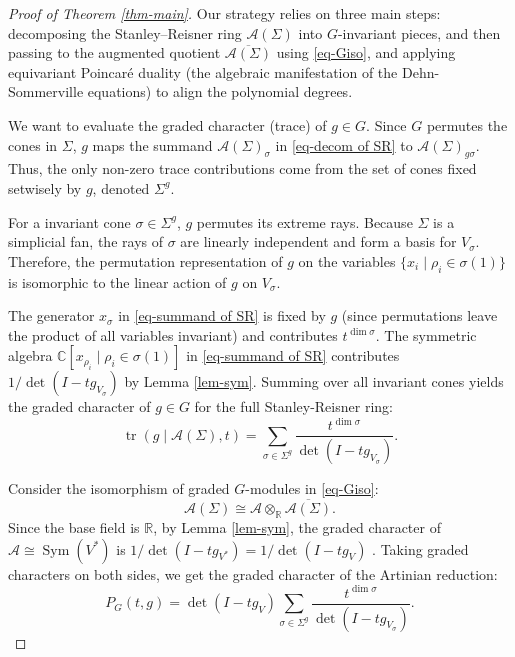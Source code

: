 \documentclass[10pt,a4paper]{amsart}
\begin{document}
\begin{proof}[Proof of Theorem \ref{thm-main}]
Our strategy relies on three main steps: decomposing the Stanley--Reisner ring $\mathcal{A}(\Sigma)$ into $G$-invariant pieces, and then passing to the augmented quotient $\overline{\mathcal{A}(\Sigma)}$ using \eqref{eq-Giso}, 
and applying equivariant Poincaré duality (the algebraic manifestation of the Dehn-Sommerville equations) to align the polynomial degrees.

We want to evaluate the graded character (trace) of $g \in G$. Since $G$ permutes the cones in $\Sigma$, $g$ maps the summand $\mathcal{A}(\Sigma)_\sigma$ in \eqref{eq-decom of SR} to $\mathcal{A}(\Sigma)_{g\sigma}$. Thus, the only non-zero trace contributions come from the set of cones fixed setwisely by $g$, denoted $\Sigma^g$. 

For a invariant cone $\sigma \in \Sigma^g$, $g$ permutes its extreme rays. Because $\Sigma$ is a simplicial fan, the rays of $\sigma$ are linearly independent and form a basis for $V_\sigma$. Therefore, the permutation representation of $g$ on the variables $\{x_i \mid \rho_i \in \sigma(1)\}$ is isomorphic to the linear action of $g$ on $V_\sigma$. 

The generator $x_\sigma$ in \eqref{eq-summand of SR} is fixed by $g$ (since permutations leave the product of all variables invariant) and contributes $t^{\dim \sigma}$. The symmetric algebra $\mathbb{C}[x_{\rho_i} \mid \rho_i \in \sigma(1)]$ in \eqref{eq-summand of SR} contributes $1 / \operatorname{det}(I - t g_{V_\sigma})$ by Lemma \ref{lem-sym}. Summing over all invariant cones yields the graded character of $g \in G$ for the full Stanley-Reisner ring:
$$\operatorname{tr}(g \mid \mathcal{A}(\Sigma), t) = \sum_{\sigma \in \Sigma^g} \frac{t^{\dim \sigma}}{\operatorname{det}(I - t g_{V_\sigma})}.$$

Consider the isomorphism of graded $G$-modules in \eqref{eq-Giso}:
$$\mathcal{A}(\Sigma)\cong \mathcal{A}\otimes_{\mathbb{R}}\overline{\mathcal{A}(\Sigma)}.$$
Since the base field is $\mathbb{R}$, by Lemma \ref{lem-sym}, the graded character of $\mathcal{A}\cong\operatorname{Sym}(V^*)$ is $1 / \operatorname{det}(I - t g_{V^*}) = 1 / \operatorname{det}(I - t g_V)$  . Taking graded characters on both sides, we get the graded character of the Artinian reduction:
\begin{equation} \label{eq-cha from Giso}
  P_G(t, g) = \operatorname{det}(I - t g_V) \sum_{\sigma \in \Sigma^g} \frac{t^{\dim \sigma}}{\operatorname{det}(I - t g_{V_\sigma})}. 
\end{equation}


\end{proof}
\end{document}
